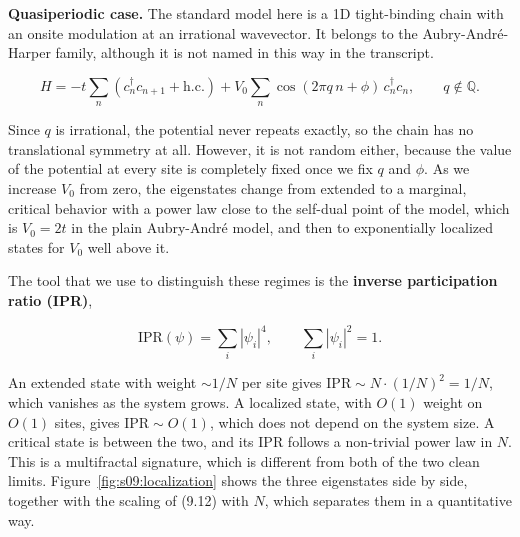 \textbf{Quasiperiodic case.} The standard model here is a 1D tight-binding chain with an onsite
modulation at an irrational wavevector. It belongs to the Aubry-André-Harper family, although it is
not named in this way in the transcript.

\begin{equation*}
H = -t\sum_n \left(c_n^\dagger c_{n+1} + \text{h.c.}\right) + V_0 \sum_n \cos(2\pi q\, n + \phi)\, c_n^\dagger c_n, \qquad q \notin \mathbb{Q}.
\end{equation*}

Since $q$ is irrational, the potential never repeats exactly, so the chain has no translational
symmetry at all. However, it is not random either, because the value of the potential at every site
is completely fixed once we fix $q$ and $\phi$. As we increase $V_0$ from zero, the eigenstates change
from extended to a marginal, critical behavior with a power law close to the self-dual point of the
model, which is $V_0 = 2t$ in the plain Aubry-André model, and then to exponentially localized states
for $V_0$ well above it.

The tool that we use to distinguish these regimes is the \textbf{inverse participation ratio (IPR)},

\begin{equation}
\mathrm{IPR}(\psi) = \sum_i |\psi_i|^4, \qquad \sum_i |\psi_i|^2 = 1.
\end{equation}

An extended state with weight $\sim 1/N$ per site gives $\mathrm{IPR} \sim N\cdot(1/N)^2 = 1/N$,
which vanishes as the system grows. A localized state, with $O(1)$ weight on $O(1)$ sites, gives
$\mathrm{IPR} \sim O(1)$, which does not depend on the system size. A critical state is between the
two, and its $\mathrm{IPR}$ follows a non-trivial power law in $N$. This is a multifractal signature,
which is different from both of the two clean limits. Figure~\ref{fig:s09:localization} shows the
three eigenstates side by side, together with the scaling of (9.12) with $N$, which separates them
in a quantitative way.



